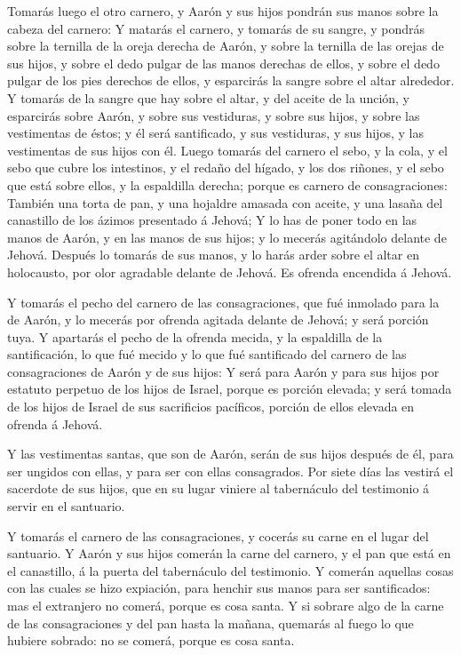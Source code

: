  Tomarás luego el otro carnero, y Aarón y sus hijos
pondrán sus manos sobre la cabeza del carnero:  Y matarás
el carnero, y tomarás de su sangre, y pondrás sobre la ternilla de la
oreja derecha de Aarón, y sobre la ternilla de las orejas de sus hijos,
y sobre el dedo pulgar de las manos derechas de ellos, y sobre el dedo
pulgar de los pies derechos de ellos, y esparcirás la sangre sobre el
altar alrededor.  Y tomarás de la sangre que hay sobre el
altar, y del aceite de la unción, y esparcirás sobre Aarón, y sobre sus
vestiduras, y sobre sus hijos, y sobre las vestimentas de éstos; y él
será santificado, y sus vestiduras, y sus hijos, y las vestimentas de
sus hijos con él.  Luego tomarás del carnero el sebo, y
la cola, y el sebo que cubre los intestinos, y el redaño del hígado, y
los dos riñones, y el sebo que está sobre ellos, y la espaldilla
derecha; porque es carnero de consagraciones:  También
una torta de pan, y una hojaldre amasada con aceite, y una lasaña del
canastillo de los ázimos presentado á Jehová;  Y lo has
de poner todo en las manos de Aarón, y en las manos de sus hijos; y lo
mecerás agitándolo delante de Jehová.  Después lo tomarás
de sus manos, y lo harás arder sobre el altar en holocausto, por olor
agradable delante de Jehová. Es ofrenda encendida á Jehová.

 Y tomarás el pecho del carnero de las consagraciones,
que fué inmolado para la de Aarón, y lo mecerás por ofrenda agitada
delante de Jehová; y será porción tuya.  Y apartarás el
pecho de la ofrenda mecida, y la espaldilla de la santificación, lo que
fué mecido y lo que fué santificado del carnero de las consagraciones de
Aarón y de sus hijos:  Y será para Aarón y para sus hijos
por estatuto perpetuo de los hijos de Israel, porque es porción elevada;
y será tomada de los hijos de Israel de sus sacrificios pacíficos,
porción de ellos elevada en ofrenda á Jehová.

 Y las vestimentas santas, que son de Aarón, serán de sus
hijos después de él, para ser ungidos con ellas, y para ser con ellas
consagrados.  Por siete días las vestirá el sacerdote de
sus hijos, que en su lugar viniere al tabernáculo del testimonio á
servir en el santuario.

 Y tomarás el carnero de las consagraciones, y cocerás su
carne en el lugar del santuario.  Y Aarón y sus hijos
comerán la carne del carnero, y el pan que está en el canastillo, á la
puerta del tabernáculo del testimonio.  Y comerán
aquellas cosas con las cuales se hizo expiación, para henchir sus manos
para ser santificados: mas el extranjero no comerá, porque es cosa
santa.  Y si sobrare algo de la carne de las
consagraciones y del pan hasta la mañana, quemarás al fuego lo que
hubiere sobrado: no se comerá, porque es cosa santa.

